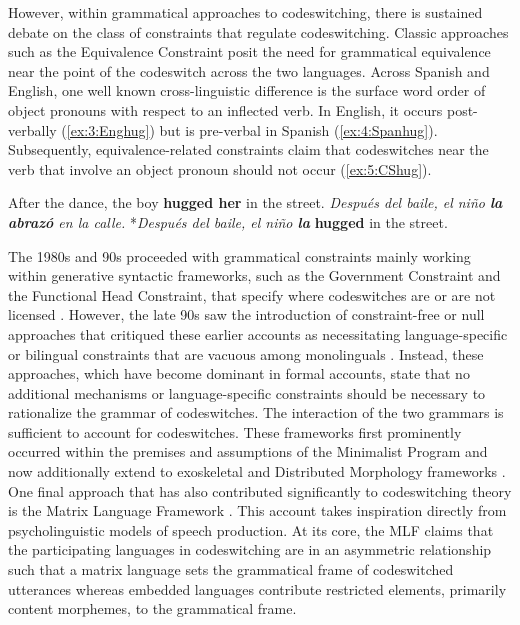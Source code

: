 \documentclass[output=paper,colorlinks,citecolor=brown]{langscibook}
\begin{document}
However, within grammatical approaches to codeswitching, there is sustained debate on the class of constraints that regulate codeswitching. Classic approaches such as the Equivalence Constraint \citep{Lipski1978,Poplack1980} posit the need for grammatical equivalence near the point of the codeswitch across the two languages. Across Spanish and English, one well known cross-linguistic difference is the surface word order of object pronouns with respect to an inflected verb. In English, it occurs post-verbally (\ref{ex:3:Enghug}) but is pre-verbal in Spanish (\ref{ex:4:Spanhug}). Subsequently, equivalence-related constraints claim that codeswitches near the verb that involve an object pronoun should not occur (\ref{ex:5:CShug}).
\begin{exe}
    \ex \label{ex:3:Enghug}
    After the dance, the boy \textbf{hugged her} in the street.
    \ex \label{ex:4:Spanhug}
    \textit{Despu\'es del baile, el ni\~no \textbf{la abraz\'o} en la calle.}
    \ex \label{ex:5:CShug}
    *\textit{Despu\'es del baile, el ni\~no \textbf{la}} \textbf{hugged} in the street.
\end{exe}
The 1980s and 90s proceeded with grammatical constraints mainly working within generative syntactic frameworks, such as the Government Constraint and the Functional Head Constraint, that specify where codeswitches are or are not licensed \citep{DiSciulloetal1986,Belazietal1994}. However, the late 90s saw the introduction of constraint-free or null approaches that critiqued these earlier accounts as necessitating language-specific or bilingual constraints that are vacuous among monolinguals \citep{MacSwan1999,Mahootian1996}. Instead, these approaches, which have become dominant in formal accounts, state that no additional mechanisms or language-specific constraints should be necessary to rationalize the grammar of codeswitches. The interaction of the two grammars is sufficient to account for codeswitches. These frameworks first prominently occurred within the premises and assumptions of the Minimalist Program and now additionally extend to exoskeletal and Distributed Morphology frameworks \citep{LohndalPutnam2024,Lopez2020}. One final approach that has also contributed significantly to codeswitching theory is the Matrix Language Framework \citep{Myers-Scotton1993,Myers-ScottonJake2000,Myers-ScottonJake2001}. This account takes inspiration directly from psycholinguistic models of speech production. At its core, the MLF claims that the participating languages in codeswitching are in an asymmetric relationship such that a matrix language sets the grammatical frame of codeswitched utterances whereas embedded languages contribute restricted elements, primarily content morphemes, to the grammatical frame.
\end{document}
